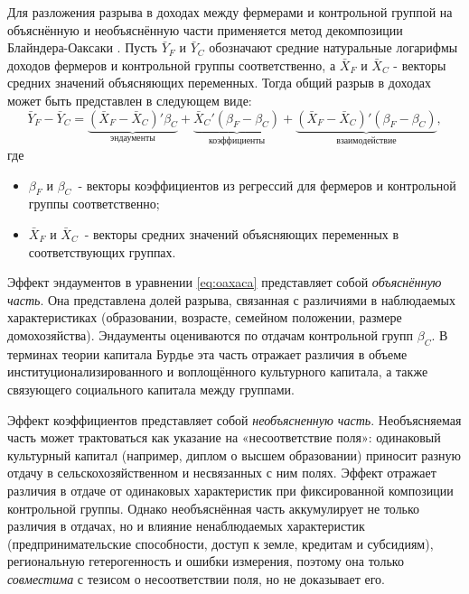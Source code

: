 \documentclass[14pt, a4paper]{article}
\begin{document}
	Для разложения разрыва в доходах между фермерами и контрольной группой на объяснённую и необъяснённую части применяется метод декомпозиции Блайндера-Оаксаки \cite{blinder1973wage, oaxaca1973male}. Пусть $\bar{Y}_F$ и $\bar{Y}_C$ обозначают средние натуральные логарифмы доходов фермеров и контрольной группы соответственно, а $\bar{X}_F$ и $\bar{X}_C$ - векторы средних значений объясняющих переменных. Тогда общий разрыв в доходах может быть представлен в следующем виде:
	\begin{equation}
		\bar{Y}_F - \bar{Y}_C
		= \underbrace{(\bar{X}_F-\bar{X}_C)'\beta_C}_{\text{эндаументы}}
		+ \underbrace{\bar{X}_C'(\beta_F-\beta_C)}_{\text{коэффициенты}}
		+ \underbrace{(\bar{X}_F-\bar{X}_C)'(\beta_F-\beta_C)}_{\text{взаимодействие}},
		\label{eq:oaxaca}
	\end{equation}
	где
	\begin{itemize}
		\item \(\beta_F\) и \(\beta_C\)~- векторы коэффициентов из
		регрессий для фермеров и контрольной группы соответственно;
		\item \(\bar{X}_F\) и \(\bar{X}_C\)~- векторы средних значений
		объясняющих переменных в соответствующих группах.
	\end{itemize}
	
	Эффект эндаументов в уравнении \eqref{eq:oaxaca} представляет собой
	\textit{объяснённую часть}. Она представлена долей разрыва,
	связанная с различиями в наблюдаемых характеристиках (образовании, возрасте, семейном положении, размере домохозяйства). Эндаументы оцениваются по отдачам контрольной групп	\(\beta_C\). В терминах теории капитала Бурдье эта часть отражает различия в объеме институционализированного и воплощённого культурного капитала, а также связующего социального капитала между группами.

	Эффект коэффициентов представляет собой \textit{необъясненную часть}. Необъясняемая часть может трактоваться как указание на «несоответствие поля»: одинаковый культурный капитал (например, диплом о высшем образовании)
	приносит разную отдачу в сельскохозяйственном и несвязанных с ним полях. Эффект отражает различия в отдаче от одинаковых характеристик при фиксированной композиции контрольной группы.  Однако необъяснённая часть аккумулирует не только различия в отдачах, но и влияние ненаблюдаемых характеристик (предпринимательские способности, доступ к земле, кредитам и субсидиям), региональную гетерогенность и ошибки измерения, поэтому она только \emph{совместима} с тезисом о несоответствии поля, но не доказывает его.
	
\end{document}
